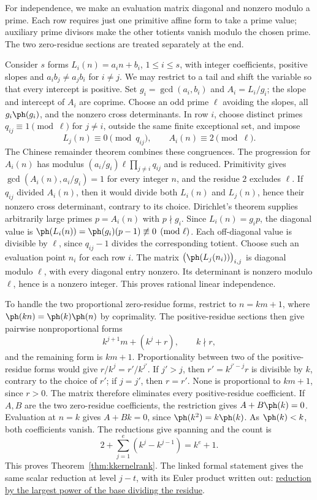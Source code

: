 \documentclass[11pt]{article}
\begin{document}
For independence, we make an evaluation matrix diagonal and nonzero
modulo a prime. Each row requires just one primitive affine form to take
a prime value; auxiliary prime divisors make the other totients vanish
modulo the chosen prime. The two zero-residue sections are treated
separately at the end.

Consider $s$ forms $L_i(n)=a_in+b_i$, $1\le i\le s$,
with integer coefficients, positive slopes and
$a_ib_j\ne a_jb_i$ for $i\ne j$. We may restrict to a tail and shift
the variable so that every intercept is positive. Set $g_i=\gcd(a_i,b_i)$ and $A_i=L_i/g_i$;
the slope and intercept of $A_i$ are coprime. Choose an odd prime $\ell$ avoiding the slopes, all $g_i\ph(g_i)$, and the
nonzero cross determinants. In row $i$, choose distinct primes
$q_{ij}\equiv1\pmod\ell$ for $j\ne i$, outside the same finite exceptional
set, and impose
\[
 L_j(n)\equiv0\pmod{q_{ij}},\qquad A_i(n)\equiv2\pmod\ell.
\]
The Chinese remainder theorem combines these congruences. The progression for $A_i(n)$ has modulus
$(a_i/g_i)\ell\prod_{j\ne i}q_{ij}$ and is reduced. Primitivity gives
$\gcd(A_i(n),a_i/g_i)=1$ for every integer $n$, and the residue $2$
excludes $\ell$. If $q_{ij}$ divided $A_i(n)$, then it would divide both
$L_i(n)$ and $L_j(n)$, hence their nonzero cross determinant,
contrary to its choice.
Dirichlet's theorem supplies arbitrarily large primes $p=A_i(n)$ with
$p\nmid g_i$. Since $L_i(n)=g_ip$, the diagonal value is
$\ph(L_i(n))=\ph(g_i)(p-1)\not\equiv0\pmod\ell$.
Each off-diagonal value is divisible by $\ell$, since $q_{ij}-1$
divides the corresponding totient.
Choose such an evaluation point $n_i$ for each row $i$. The matrix
$\bigl(\ph(L_j(n_i))\bigr)_{i,j}$ is diagonal
modulo $\ell$, with every diagonal entry nonzero. Its determinant is
nonzero modulo $\ell$, hence is a nonzero integer. This proves rational
linear independence.

To handle the two proportional zero-residue forms, restrict to
$n=km+1$, where $\ph(kn)=\ph(k)\ph(n)$ by coprimality.
The positive-residue sections then give pairwise nonproportional forms
\[
 k^{j+1}m+(k^j+r),\qquad k\nmid r,
\]
and the remaining form is $km+1$. Proportionality between two of the
positive-residue forms would give $r/k^j=r'/k^{j'}$. If $j'>j$, then
$r'=k^{j'-j}r$ is divisible by $k$, contrary to the choice of $r'$;
if $j=j'$, then $r=r'$. None is proportional to $km+1$, since $r>0$.
The matrix therefore eliminates every positive-residue coefficient. If $A,B$ are the
two zero-residue coefficients, the restriction gives
$A+B\ph(k)=0$. Evaluation at $n=k$ gives $A+Bk=0$, since
$\ph(k^2)=k\ph(k)$. As $\ph(k)<k$, both coefficients vanish.
The reductions give spanning and the count is
\[
 2+\sum_{j=1}^e(k^j-k^{j-1})=k^e+1.
\]
This proves Theorem~\ref{thm:kkernelrank}. The linked formal statement gives
the same scalar reduction at level $j-t$, with its Euler product written out:
\href{https://github.com/wcook04/plectis-erdos/blob/f36a98bf3d3e6f65f1074e3b800e3293d5b8a51a/ErdosProblems/Erdos249/PaperCompleteR7/KernelIntegral.lean#L226}{reduction by the largest power of the base dividing the residue}.
\end{document}
